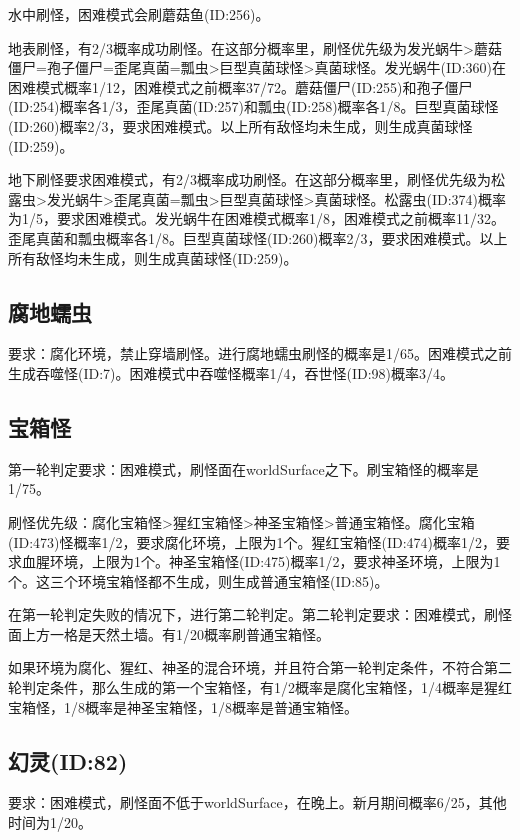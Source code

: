 水中刷怪，困难模式会刷蘑菇鱼(ID:256)。

地表刷怪，有2/3概率成功刷怪。在这部分概率里，刷怪优先级为发光蜗牛>蘑菇僵尸=孢子僵尸=歪尾真菌=瓢虫>巨型真菌球怪>真菌球怪。发光蜗牛(ID:360)在困难模式概率1/12，困难模式之前概率37/72。蘑菇僵尸(ID:255)和孢子僵尸(ID:254)概率各1/3，歪尾真菌(ID:257)和瓢虫(ID:258)概率各1/8。巨型真菌球怪(ID:260)概率2/3，要求困难模式。以上所有敌怪均未生成，则生成真菌球怪(ID:259)。

地下刷怪要求困难模式，有2/3概率成功刷怪。在这部分概率里，刷怪优先级为松露虫>发光蜗牛>歪尾真菌=瓢虫>巨型真菌球怪>真菌球怪。松露虫(ID:374)概率为1/5，要求困难模式。发光蜗牛在困难模式概率1/8，困难模式之前概率11/32。歪尾真菌和瓢虫概率各1/8。巨型真菌球怪(ID:260)概率2/3，要求困难模式。以上所有敌怪均未生成，则生成真菌球怪(ID:259)。

\subsection{腐地蠕虫}
要求：腐化环境，禁止穿墙刷怪。进行腐地蠕虫刷怪的概率是1/65。困难模式之前生成吞噬怪(ID:7)。困难模式中吞噬怪概率1/4，吞世怪(ID:98)概率3/4。

\subsection{宝箱怪}
第一轮判定要求：困难模式，刷怪面在worldSurface之下。刷宝箱怪的概率是1/75。

刷怪优先级：腐化宝箱怪>猩红宝箱怪>神圣宝箱怪>普通宝箱怪。腐化宝箱(ID:473)怪概率1/2，要求腐化环境，上限为1个。猩红宝箱怪(ID:474)概率1/2，要求血腥环境，上限为1个。神圣宝箱怪(ID:475)概率1/2，要求神圣环境，上限为1个。这三个环境宝箱怪都不生成，则生成普通宝箱怪(ID:85)。

在第一轮判定失败的情况下，进行第二轮判定。第二轮判定要求：困难模式，刷怪面上方一格是天然土墙。有1/20概率刷普通宝箱怪。

\begin{remark}
如果环境为腐化、猩红、神圣的混合环境，并且符合第一轮判定条件，不符合第二轮判定条件，那么生成的第一个宝箱怪，有1/2概率是腐化宝箱怪，1/4概率是猩红宝箱怪，1/8概率是神圣宝箱怪，1/8概率是普通宝箱怪。
\end{remark}

\subsection{幻灵(ID:82)}
要求：困难模式，刷怪面不低于worldSurface，在晚上。新月期间概率6/25，其他时间为1/20。

